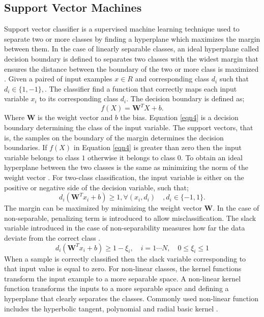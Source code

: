 \documentclass[a4paper,fleqn]{cas-dc}
\begin{document}
\subsection{Support Vector Machines  }\label{SVM}
Support vector classifier is a supervised machine learning technique used to separate two or more classes by finding a hyperplane which maximizes the margin between them. In the case of linearly separable classes, an ideal hyperplane called decision boundary is defined to separates two classes with the widest margin that ensures the distance between the boundary of the two or more class is maximized \cite{friedman2001elements}. Given a paired of input examples $x\in R $  and corresponding class $d_{i}$ such that  $d_{i} \in \{1, -1\}, $. The classifier find a function that correctly maps each input variable $x_{i}$ to its corresponding class $ d_{i} $.  The decision boundary is defined as;
\begin{equation}\label{eqn4}
f(X) = \textbf{W}^{T}X + b.
\end{equation}
Where $\textbf{W}$ is the weight vector and $b$ the bias. Equation \eqref{eqn4} is a decision boundary determining the class of the input variable. The support vectors, that is, the samples on the boundary of the margin determines the decision boundaries. If $f(X)$  in Equation \eqref{eqn4} is greater than zero then the input variable belongs to class $1$ otherwise it belongs to class $0$. To obtain an ideal hyperplane between the two classes is the same as minimizing the norm of the weight vector \cite{friedman2001elements}. For two-class classification, the input variable is either on the positive or negative side of the decision variable, such that;
\begin{equation}
d_{i}(\textbf{W}^{T}x_{i} + b)\geq 1, \forall (x_{i},d_{i}) \quad , d_{i} \in \{ -1,1\}.
\end{equation}
The margin can be maximized by minimizing the weight vector $\textbf{W}$. In the case of non-separable, penalizing term is introduced to allow misclassification. The slack variable introduced in the case of non-separability measures how far the data deviate from the correct class
\cite{kelleher2015fundamentals}.
\begin{equation}
d_{i}(\textbf{W}^{T}x_{i} + b)\geq 1 - \xi_{i},  \quad i = 1 \cdots N, \quad 0 \leq \xi_{i} \leq 1
\end{equation}
When a sample is correctly classified then the slack variable corresponding to that input value is equal to zero. For non-linear classes, the kernel functions transform the input example to a more separable space. A non-linear kernel function transforms the inputs to a more separable space and defining a hyperplane that clearly separates the classes.  Commonly used non-linear function includes the hyperbolic tangent, polynomial and radial basic kernel \cite{aggarwal2014data}.
\end{document}
